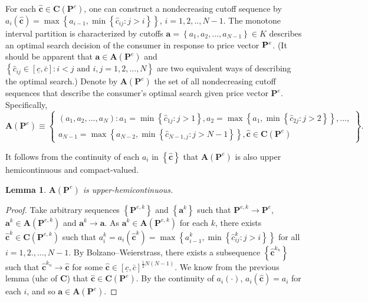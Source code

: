 \documentclass[14pt]{article}
\theoremstyle{plain}
\newtheorem{lemma}[thm]{Lemma}
\theoremstyle{definition}
\theoremstyle{remark}
\DeclareRobustCommand\1{\futurelet\oneNext\oneCheck}
\begin{document}
For each $\mathbf{\hat{c}\in C}\left( \mathbf{P}^{e}\right) $, one can
construct a nondecreasing cutoff sequence by $a_{i}\left( \mathbf{\hat{c}}%
\right) =\max \left\{ a_{i-1},\min \left\{ \hat{c}_{ij}:j>i\right\} \right\} 
$, $i=1,2,..,N-1$. The monotone interval partition is characterized by cutoffs $%
\mathbf{a}=\left\{ a_{1},a_{2},...,a_{N-1}\right\} \in K$ describes an
optimal search decision of the consumer in response to price vector $\mathbf{%
P}^{e}$. (It should be apparent that $\mathbf{a\in A}\left( \mathbf{P}%
^{e}\right) $ and $\left\{ \hat{c}_{ij}\in \left[ \underline{c},\bar{c}%
\right] :i<j\text{ and }i,j=1,2,...,N\right\} $ are two equivalent ways of
describing the optimal search.) Denote by $\mathbf{A}\left( \mathbf{P}%
^{e}\right) $ the set of all nondecreasing cutoff sequences that describe
the consumer's optimal search given price vector $\mathbf{P}^{e}$.
Specifically,%
\begin{equation*}
\mathbf{A}\left( \mathbf{P}^{e}\right) \equiv \left\{ 
\begin{array}{c}
\left( a_{1},a_{2},...,a_{N}\right) :a_{1}=\min \left\{ \hat{c}%
_{1j}:j>1\right\} ,a_{2}=\max \left\{ a_{1},\min \left\{ \hat{c}%
_{2j}:j>2\right\} \right\} ,..., \\ 
a_{N-1}=\max \left\{ a_{N-2},\min \left\{ \hat{c}_{N-1,j}:j>N-1\right\}
\right\} ,\mathbf{\hat{c}\in C}\left( \mathbf{P}^{e}\right) 
\end{array}%
\right\} \text{.}
\end{equation*}

It follows from the continuity of each $a_{i}$ in $\left\{ \mathbf{\hat{c}}%
\right\} $ that $\mathbf{A}\left( \mathbf{P}^{e}\right) $ is also upper
hemicontinuous and compact-valued.

\begin{lemma}
$\mathbf{A}\left( \mathbf{P}^{e}\right) $ is upper-hemicontinuous.
\end{lemma}

\begin{proof}
Take arbitrary sequences $\left\{ \mathbf{P}^{e,k}\right\} $ and $\left\{ 
\mathbf{a}^{k}\right\} $ such that $\mathbf{P}^{e,k}\rightarrow \mathbf{P}%
^{e}$, $\mathbf{a}^{k}\in \mathbf{A}\left( \mathbf{P}^{e,k}\right) $ and $%
\mathbf{a}^{k}\rightarrow \mathbf{a}$. As $\mathbf{a}^{k}\in \mathbf{A}%
\left( \mathbf{P}^{e,k}\right) $ for each $k$, there exists $\mathbf{\hat{c}}%
^{k}\mathbf{\in C}\left( \mathbf{P}^{e,k}\right) $ such that $%
a_{i}^{k}=a_{i}\left( \mathbf{\hat{c}}^{k}\right) =\max \left\{
a_{i-1}^{k},\min \left\{ \hat{c}_{ij}^{k}:j>i\right\} \right\} $ for all $%
i=1,2.,...,N-1$. By Bolzano--Weierstrass, there exists a subsequence $\left\{ 
\mathbf{\hat{c}}^{k_{n}}\right\} $ such that $\mathbf{\hat{c}}%
^{k_{n}}\rightarrow \mathbf{\hat{c}}$ for some $\mathbf{\hat{c}\in }\left[ 
\underline{c},\bar{c}\right] ^{\frac{1}{2}N\left( N-1\right) }$. We know
from the previous lemma (uhc of $\mathbf{C}$) that $\mathbf{\hat{c}\in C}%
\left( \mathbf{P}^{e}\right) $. By the continuity of $a_{i}\left( \cdot
\right) $, $a_{i}\left( \mathbf{\hat{c}}\right) =a_{i}$ for each $i$, and so 
$\mathbf{a\in A}\left( \mathbf{P}^{e}\right) $.
\end{proof}
\end{document}
